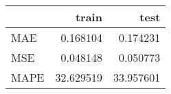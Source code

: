 \begin{tabular}{lrr}
\toprule
{} &      train &       test \\
\midrule
MAE  &   0.168104 &   0.174231 \\
MSE  &   0.048148 &   0.050773 \\
MAPE &  32.629519 &  33.957601 \\
\bottomrule
\end{tabular}

